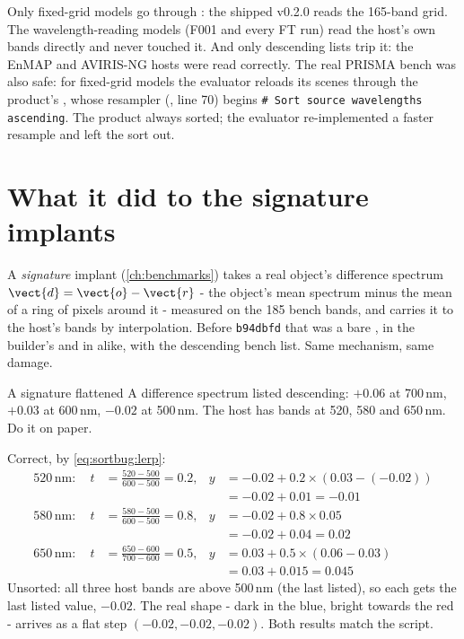\begin{sourcenote}
Only fixed-grid models go through : the shipped v0.2.0 reads the 165-band grid. The
wavelength-reading models (F001 and every FT run) read the host's own bands directly and never touched it. And
only descending lists trip it: the EnMAP and AVIRIS-NG hosts were read correctly. The real PRISMA bench was also
safe: for fixed-grid models the evaluator reloads its scenes through the product's ,
whose resampler (, line 70) begins
\texttt{\# Sort source wavelengths ascending}. The product always sorted; the evaluator re-implemented a faster
resample and left the sort out.
\end{sourcenote}

\section{What it did to the signature implants}\label{sec:sortbug:signature}

A \emph{signature} implant (\cref{ch:benchmarks}) takes a real object's difference spectrum $\vect{d} =
\vect{o} - \vect{r}$ - the object's mean spectrum minus the mean of a ring of pixels around it - measured on
the 185 bench bands, and carries it to the host's bands by interpolation. Before \texttt{b94dbfd} that was a bare
, in the builder's  and in  alike, with
 the descending bench list. Same mechanism, same damage.

\begin{worked}[label={we:sortbug:signature}]{A signature flattened}
A difference spectrum listed descending: $+0.06$ at 700\,nm, $+0.03$ at 600\,nm, $-0.02$ at 500\,nm. The host
has bands at 520, 580 and 650\,nm. Do it on paper.

Correct, by \eqref{eq:sortbug:lerp}:
\begin{align*}
520\,\text{nm}:\quad t &= \tfrac{520 - 500}{600 - 500} = 0.2, & y &= -0.02 + 0.2 \times (0.03 - (-0.02))\\
 & & &= -0.02 + 0.01 = -0.01\\
580\,\text{nm}:\quad t &= \tfrac{580 - 500}{600 - 500} = 0.8, & y &= -0.02 + 0.8 \times 0.05\\
 & & &= -0.02 + 0.04 = 0.02\\
650\,\text{nm}:\quad t &= \tfrac{650 - 600}{700 - 600} = 0.5, & y &= 0.03 + 0.5 \times (0.06 - 0.03)\\
 & & &= 0.03 + 0.015 = 0.045
\end{align*}
Unsorted: all three host bands are above 500\,nm (the last listed), so each gets the last listed value,
$-0.02$. The real shape - dark in the blue, bright towards the red - arrives as a flat step $(-0.02, -0.02,
-0.02)$. Both results match the script\tagC.
\end{worked}

